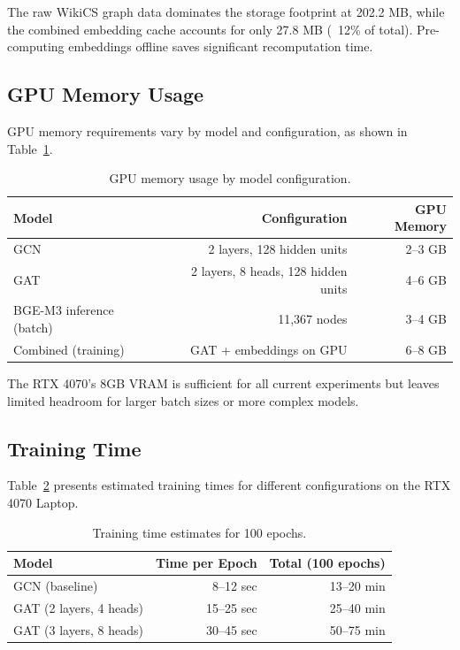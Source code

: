 The raw WikiCS graph data dominates the storage footprint at 202.2 MB, while the combined embedding cache accounts for only 27.8 MB (~12\% of total). Pre-computing embeddings offline saves significant recomputation time.

\subsection{GPU Memory Usage}

GPU memory requirements vary by model and configuration, as shown in Table~\ref{tab:gpu-memory}.

\begin{table}[htbp]
\centering
\caption{GPU memory usage by model configuration.}
\label{tab:gpu-memory}
\begin{tabular}{lrr}
\toprule
\textbf{Model} & \textbf{Configuration} & \textbf{GPU Memory} \\
\midrule
GCN & 2 layers, 128 hidden units & 2--3 GB \\
GAT & 2 layers, 8 heads, 128 hidden units & 4--6 GB \\
BGE-M3 inference (batch) & 11,367 nodes & 3--4 GB \\
Combined (training) & GAT + embeddings on GPU & 6--8 GB \\
\bottomrule
\end{tabular}
\end{table}

The RTX 4070's 8GB VRAM is sufficient for all current experiments but leaves limited headroom for larger batch sizes or more complex models.

\subsection{Training Time}

Table~\ref{tab:training-time} presents estimated training times for different configurations on the RTX 4070 Laptop.

\begin{table}[htbp]
\centering
\caption{Training time estimates for 100 epochs.}
\label{tab:training-time}
\begin{tabular}{lrr}
\toprule
\textbf{Model} & \textbf{Time per Epoch} & \textbf{Total (100 epochs)} \\
\midrule
GCN (baseline) & 8--12 sec & 13--20 min \\
GAT (2 layers, 4 heads) & 15--25 sec & 25--40 min \\
GAT (3 layers, 8 heads) & 30--45 sec & 50--75 min \\
\bottomrule
\end{tabular}
\end{table}

